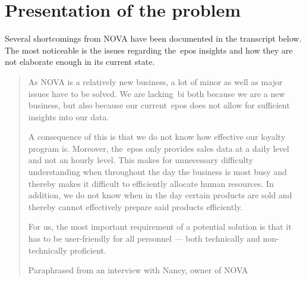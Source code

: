 \section{Presentation of the problem}\label{sec:presentation-of-the-problem}

Several shortcomings from NOVA have been documented in the transcript below.
The most noticeable is the issues regarding the~\acrfull{epos} insights and how they are not elaborate enough in its
current state.

\blockquote[Paraphrased from an interview with Nancy, owner of NOVA]{As NOVA is a relatively new business,
    a lot of minor as well as major issues have to be solved.
    We are lacking~\acrshort{bi} both because we are a new business,
    but also because our current~\acrshort{epos} does not allow for sufficient insights into our data.

    A consequence of this is that we do not know how effective our loyalty program is.
    Moreover, the~\acrshort{epos} only provides sales data at a daily level and not an hourly level.
    This makes for unnecessary difficulty understanding when throughout the day the business is most busy and thereby
    makes it difficult to efficiently allocate human resources.
    In addition, we do not know when in the day certain products are sold and thereby cannot effectively prepare said
    products efficiently.

    For us, the most important requirement of a potential solution is that it has to be user-friendly for all
    personnel --- both technically and non-technically proficient.}
